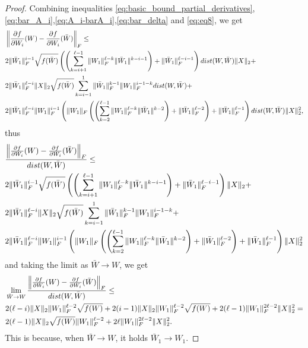 \documentclass[10pt,a4paper]{amsart}
\begin{document}
\begin{proof}
Combining inequalities \eqref{eq:basic_bound_partial_derivatives},\eqref{eq:bar_A_i},\eqref{eq:A_i-barA_i},\eqref{eq:bar_delta} and \eqref{eq:eq8},
we get
\begin{align*}
    &\left\|\frac{\partial f}{\partial W_i}(W)-\frac{\partial f}{\partial W_i}(\bar W) \right\|_{\rm F} \leq \\ &  2\|\bar W_1\|_{\rm F}^{i-1} \sqrt{f(\bar W)} \left(\left(\sum_{k=i+1}^{\ell-1} \|W_1\|_{\rm F}^{\ell-k} \|\bar W_1\|^{k-i-1}\right) + \|\bar W_1\|_{\rm F}^{\ell-i-1}\right)  \textnormal{dist}(W,\bar W) \|X\|_2 + \\ & 2 \|\bar W_1\|_{\rm F}^{\ell-i} \|X\|_2 \sqrt{f(\bar W)} \sum_{k=i-1}^1  \|\bar W_1\|_{\rm F}^{k-1} \| W_1 \|_{\rm F}^{i-1-k} \textnormal{dist}(W,\bar W) + \\ & 2\|\bar W_1\|_{\rm F}^{\ell-i} \|W_1\|_{\rm F}^{i-1} \left(\|W_1\|_{\rm F} \left(\left(\sum_{k=2}^{\ell-1} \|W_1\|_{\rm F}^{\ell-k} \|\bar W_1\|^{k-2}\right) + \|\bar W_1\|_{\rm F}^{\ell-2} \right) + \|\bar W_1\|_{\rm F}^{\ell-1} \right) \textnormal{dist}(W,\bar W) \|X\|^2_2,  
\end{align*}
thus
\begin{align*}
    &\frac{\left\|\frac{\partial f}{\partial W_i}(W)-\frac{\partial f}{\partial W_i}(\bar W) \right\|_{\rm F}}{\textnormal{dist}(W,\bar W)} \leq \\ &  2\|\bar W_1\|_{\rm F}^{i-1} \sqrt{f(\bar W)} \left(\left(\sum_{k=i+1}^{\ell-1} \|W_1\|_{\rm F}^{\ell-k} \|\bar W_1\|^{k-i-1}\right) + \|\bar W_1\|_{\rm F}^{\ell-i-1}\right) \|X\|_2 + \\ & 2 \|\bar W_1\|_{\rm F}^{\ell-i} \|X\|_2 \sqrt{f(\bar W)} \sum_{k=i-1}^1  \|\bar W_1\|_{\rm F}^{k-1} \| W_1 \|_{\rm F}^{i-1-k} + \\ & 2 \|\bar W_1\|_{\rm F}^{\ell-i} \|W_1\|_{\rm F}^{i-1} \left(\|W_1\|_{\rm F} \left(\left(\sum_{k=2}^{\ell-1} \|W_1\|_{\rm F}^{\ell-k} \|\bar W_1\|^{k-2}\right) + \|\bar W_1\|_{\rm F}^{\ell-2} \right) + \|\bar W_1\|_{\rm F}^{\ell-1} \right) \|X\|^2_2
\end{align*}
and taking the limit as $\bar W \longrightarrow W$, we get
\begin{align*}
    &\lim_{\bar W \rightarrow W}\frac{\left\|\frac{\partial f}{\partial W_i}(W)-\frac{\partial f}{\partial W_i}(\bar W) \right\|_{\rm F}}{\textnormal{dist}(W,\bar W)} \leq \\ &  2 (\ell-i) \|X\|_2 \|W_1\|_{\rm F}^{\ell-2} \sqrt{f(W)}  +2 (i-1) \|X\|_2 \|W_1\|_{\rm F}^{\ell-2} \sqrt{f(W)} + 2 (\ell-1) \|W_1\|_{\rm F}^{2 \ell-2} \|X\|_2^2 = \\ & 2 (\ell-1) \|X\|_2 \sqrt{f(W)} \|W_1\|_{\rm F}^{\ell-2} + 2 \ell \|W_1\|_{\rm F}^{2 \ell-2} \|X\|_2^2.
\end{align*}
This is because, when $\bar W \longrightarrow W$, it holds $\bar W_1\longrightarrow W_1$.


\end{proof}
\end{document}

